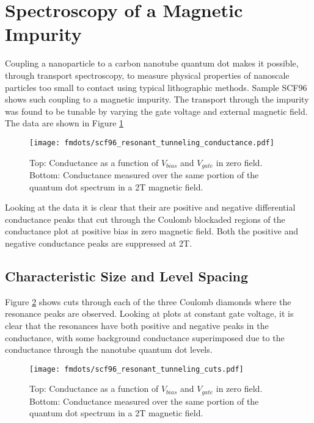 \section{Spectroscopy of a Magnetic Impurity}
\label{sec:imurity_tunneling}

Coupling a nanoparticle to a carbon nanotube quantum dot makes it possible, through transport spectroscopy, to measure physical properties of nanoscale particles too small to contact using typical lithographic methods. Sample SCF96 shows such coupling to a magnetic impurity. The transport through the impurity was found to be tunable by varying the gate voltage and external magnetic field. The data are shown in Figure \ref{fig:resonant_tunneling}

\begin{figure}
    \centering
    \texttt{[image: fmdots/scf96\_resonant\_tunneling\_conductance.pdf]}
    \caption{Top: Conductance as a function of $V_{bias}$ and $V_{gate}$ in zero field. Bottom: Conductance measured over the same portion of the quantum dot spectrum in a 2T magnetic field.}
    \label{fig:resonant_tunneling}
\end{figure}

Looking at the data it is clear that their are positive and negative differential conductance peaks that cut through the Coulomb blockaded regions of the conductance plot at positive bias in zero magnetic field. Both the positive and negative conductance peaks are suppressed at 2T.

\subsection{Characteristic Size and Level Spacing}

Figure \ref{fig:resonance_cuts} shows cuts through each of the three Coulomb diamonds where the resonance peaks are observed. Looking at plots at constant gate voltage, it is clear that the resonances have both positive and negative peaks in the conductance, with some background conductance superimposed due to the conductance through the nanotube quantum dot levels.

\begin{figure}
    \centering
    \texttt{[image: fmdots/scf96\_resonant\_tunneling\_cuts.pdf]}
    \caption{Top: Conductance as a function of $V_{bias}$ and $V_{gate}$ in zero field. Bottom: Conductance measured over the same portion of the quantum dot spectrum in a 2T magnetic field.}
    \label{fig:resonance_cuts}
\end{figure}

